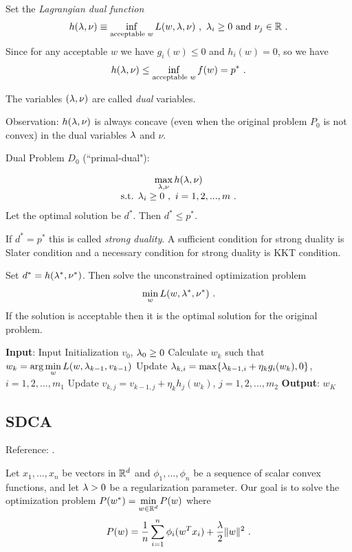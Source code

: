 Set the \textit{Lagrangian dual function}
$$h(\lambda, \nu)\equiv \inf\limits_{\text{acceptable } w}L(w,\lambda,\nu) \ , \ \lambda_i\geq 0 \text{ and } \nu_j\in \mathbb R \ .$$
Since for any acceptable $w$ we have $g_i(w)\leq 0$ and $h_i(w)=0$, so we have
$$h(\lambda, \nu)\leq \inf\limits_{\text{acceptable } w}f(w)=p^* \ .$$

The variables $(\lambda, \nu)$ are called \textit{dual} variables. 

Observation: $h(\lambda, \nu)$ is always concave (even when the original problem $P_0$ is not convex) in the dual variables $\lambda$ and $\nu$.

Dual Problem $D_0$ (``primal-dual"):

$$\begin{array}{c}
\max\limits_{\lambda, \nu}h(\lambda, \nu) \\
\text{s.t. }  \lambda_i\geq 0 \ , \ i=1,2,...,m \ .
\end{array}$$
Let the optimal solution be $d^*$. Then $d^*\leq p^*$.

If $d^*=p^*$ this is called \textit{strong duality}. A sufficient condition for strong duality is Slater condition and
a necessary condition for strong duality is KKT condition.

Set $d^*=h(\lambda^*, \nu^*)$. Then solve the unconstrained optimization problem
$$\min\limits_{w}L(w,\lambda^*, \nu^*) \ .$$
If the solution is acceptable then it is the optimal solution for the original problem.

\begin{algorithm}[H]
\caption{Dual Coordinate Ascent}
\label{Alg:DualCoordinateAscent}
\begin{algorithmic}[1]
\STATE \textbf{Input}: Input Initialization $v_0$, $\lambda_0\geq 0$
    \STATE Calculate $w_k$ such that $w_k=\arg\min\limits_{w}L(w,\lambda_{k-1},v_{k-1})$
    \STATE Update $\lambda_{k,i}=\max\{\lambda_{k-1,i}+\eta_k g_i(w_k), 0\}$, $i=1,2,...,m_1$
    \STATE Update $v_{k,j}=v_{k-1,j}+\eta_k h_j(w_k)$, $j=1,2,...,m_2$
\ENDFOR
\STATE \textbf{Output}: $w_K$
\end{algorithmic}
\end{algorithm}


\subsection{SDCA}

Reference: \cite{SchwarzZhangSDCA}.

Let $x_1,...,x_n$ be vectors in $\mathbb R^d$ and $\phi_1,...,\phi_n$ be a sequence of scalar convex functions, 
and let $\lambda>0$ be a regularization parameter. Our goal is to solve the optimization problem 
$P(w^*)=\min\limits_{w\in \mathbb R^d}P(w)$ where
$$P(w)=\dfrac{1}{n}\sum\limits_{i=1}^n \phi_i(w^Tx_i)+\dfrac{\lambda}{2}\|w\|^2 \ .$$ 

